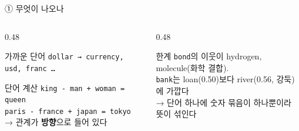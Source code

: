 \begin{frame}{ ① 무엇이 나오나}
\begin{columns}[T]
\begin{column}{0.48\textwidth}
\begin{block}{가까운 단어}
\texttt{dollar → currency, usd, franc …}\\
\end{block}
\begin{block}{단어 계산}
\texttt{king - man + woman = queen}\\
\texttt{paris - france + japan = tokyo}\\[2pt]
→ 관계가 \textbf{방향}으로 들어 있다
\end{block}
\end{column}
\begin{column}{0.48\textwidth}
\begin{alertblock}{한계}
\texttt{bond}의 이웃이 hydrogen, molecule(화학 결합).\\[2pt]
\texttt{bank}는 loan(\num{0.50})보다 river(\num{0.56}, 강둑)에 가깝다\\[2pt]
→ 단어 하나에 숫자 묶음이 하나뿐이라 뜻이 섞인다
\end{alertblock}
\end{column}
\end{columns}
\end{frame}

